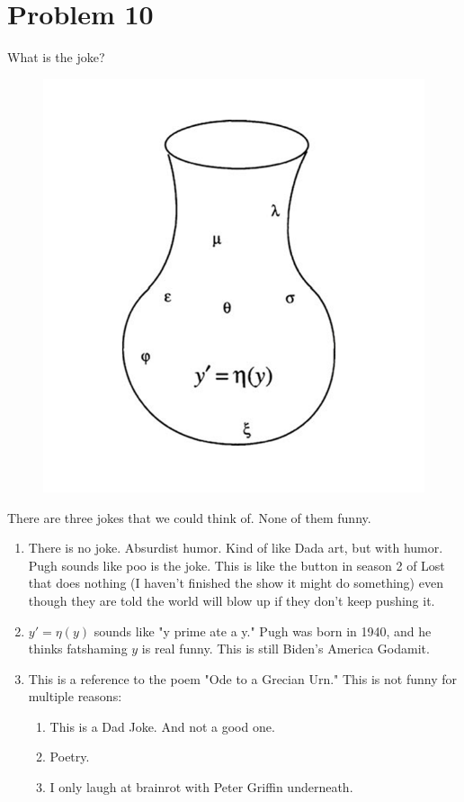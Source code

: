 \documentclass[11pt]{article}
\begin{document}
\section*{Problem 10}
\begin{problem}
    What is the joke?
    \begin{figure}[h]
        \centering
        \includegraphics[width=0.5\linewidth]{Images/HW5.png}
    \end{figure}
\end{problem}
\begin{solution}
There are three jokes that we could think of. None of them funny.
    \begin{enumerate}
        \item There is no joke. Absurdist humor. Kind of like Dada art, but with humor. Pugh sounds like poo is the joke. This is like the button in season 2 of Lost that does nothing (I haven't finished the show it might do something) even though they are told the world will blow up if they don't keep pushing it.
        \item $y' =\eta(y)$ sounds like "y prime ate a y." Pugh was born in 1940, and he thinks fatshaming $y$ is real funny. This is still Biden's America Godamit.
        \item This is a reference to the poem 
        "Ode to a Grecian Urn." This is not funny for multiple reasons:
            \begin{enumerate}
                \item This is a Dad Joke. And not a good one. 
                \item Poetry.
                \item I only laugh at brainrot with Peter Griffin underneath.
            \end{enumerate}        
    \end{enumerate}
\end{solution}
\end{document}
